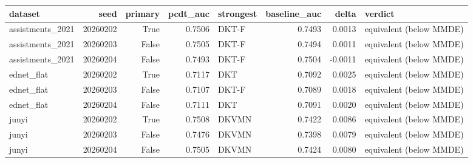 \begin{tabular}{lrrrlrrl}
\toprule
dataset & seed & primary & pcdt\_auc & strongest & baseline\_auc & delta & verdict \\
\midrule
assistments\_2021 & 20260202 & True & 0.7506 & DKT-F & 0.7493 & 0.0013 & equivalent (below MMDE) \\
assistments\_2021 & 20260203 & False & 0.7505 & DKT-F & 0.7494 & 0.0011 & equivalent (below MMDE) \\
assistments\_2021 & 20260204 & False & 0.7493 & DKT-F & 0.7504 & -0.0011 & equivalent (below MMDE) \\
ednet\_flat & 20260202 & True & 0.7117 & DKT & 0.7092 & 0.0025 & equivalent (below MMDE) \\
ednet\_flat & 20260203 & False & 0.7107 & DKT-F & 0.7089 & 0.0018 & equivalent (below MMDE) \\
ednet\_flat & 20260204 & False & 0.7111 & DKT & 0.7091 & 0.0020 & equivalent (below MMDE) \\
junyi & 20260202 & True & 0.7508 & DKVMN & 0.7422 & 0.0086 & equivalent (below MMDE) \\
junyi & 20260203 & False & 0.7476 & DKVMN & 0.7398 & 0.0079 & equivalent (below MMDE) \\
junyi & 20260204 & False & 0.7505 & DKVMN & 0.7424 & 0.0080 & equivalent (below MMDE) \\
\bottomrule
\end{tabular}

